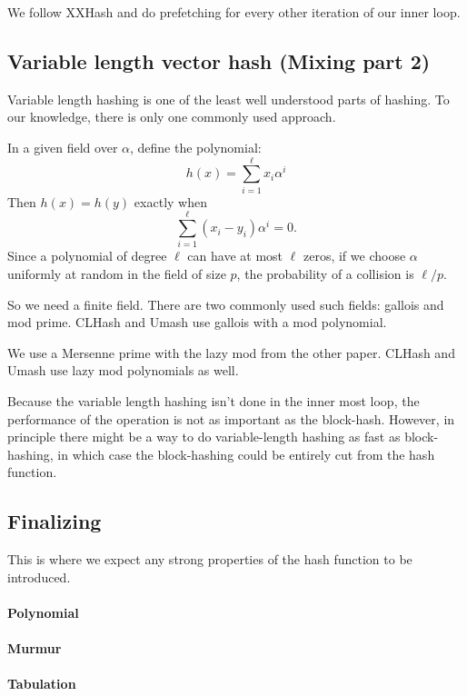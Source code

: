 We follow XXHash and do prefetching for every other iteration of our inner loop.

\subsection{Variable length vector hash (Mixing part 2)}

Variable length hashing is one of the least well understood parts of hashing.
To our knowledge, there is only one commonly used approach.

In a given field over $\alpha$, define the polynomial:
\[h(x) = \sum_{i=1}^\ell x_i \alpha^i\]
Then $h(x)=h(y)$ exactly when
\[\sum_{i=1}^\ell (x_i-y_i) \alpha^i = 0.\]
Since a polynomial of degree $\ell$ can have at most $\ell$ zeros,
if we choose $\alpha$ uniformly at random in the field of size $p$,
the probability of a collision is $\ell/p$.

So we need a finite field.
There are two commonly used such fields: gallois and mod prime.
CLHash and Umash use gallois with a mod polynomial.

We use a Mersenne prime
with the lazy mod from the other paper.
CLHash and Umash use lazy mod polynomials as well.

Because the variable length hashing isn't done in the inner most loop,
the performance of the operation is not as important as the block-hash.
However, in principle there might be a way to do variable-length hashing as fast as block-hashing, in which case the block-hashing could be entirely cut from the hash function.


\subsection{Finalizing}

This is where we expect any strong properties of the hash function to be introduced.

\paragraph{Polynomial}
\paragraph{Murmur}
\paragraph{Tabulation}



